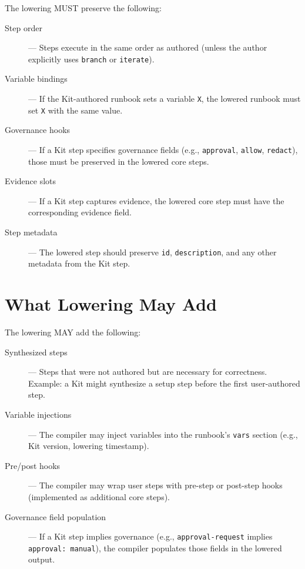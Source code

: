 The lowering MUST preserve the following:

\begin{description}
  \item[Step order] --- Steps execute in the same order as authored (unless the
    author explicitly uses \texttt{branch} or \texttt{iterate}).
  \item[Variable bindings] --- If the Kit-authored runbook sets a variable
    \texttt{X}, the lowered runbook must set \texttt{X} with the same value.
  \item[Governance hooks] --- If a Kit step specifies governance fields (e.g.,
    \texttt{approval}, \texttt{allow}, \texttt{redact}), those must be
    preserved in the lowered core steps.
  \item[Evidence slots] --- If a Kit step captures evidence, the lowered core
    step must have the corresponding evidence field.
  \item[Step metadata] --- The lowered step should preserve \texttt{id},
    \texttt{description}, and any other metadata from the Kit step.
\end{description}

\section{What Lowering May Add}
\label{sec:may-add}

The lowering MAY add the following:

\begin{description}
  \item[Synthesized steps] --- Steps that were not authored but are necessary
    for correctness. Example: a Kit might synthesize a setup step before the
    first user-authored step.
  \item[Variable injections] --- The compiler may inject variables into the
    runbook's \texttt{vars} section (e.g., Kit version, lowering timestamp).
  \item[Pre/post hooks] --- The compiler may wrap user steps with pre-step or
    post-step hooks (implemented as additional core steps).
  \item[Governance field population] --- If a Kit step implies governance (e.g.,
    \texttt{approval-request} implies \texttt{approval: manual}), the compiler
    populates those fields in the lowered output.
\end{description}

